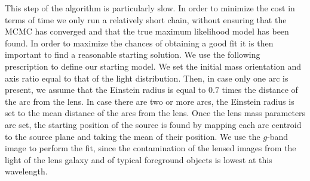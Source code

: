 \documentclass[a4paper,fleqn,usenatbib]{mnras}
\begin{document}
This step of the algorithm is particularly slow. In order to minimize the cost in terms of time we only run a relatively short chain, without ensuring that the MCMC has converged and that the true maximum likelihood model has been found.
In order to maximize the chances of obtaining a good fit it is then important to find a reasonable starting solution.
We use the following prescription to define our starting model. We set the initial mass orientation and axis ratio equal to that of the light distribution. Then, in case only one arc is present, we assume that the Einstein radius is equal to $0.7$ times the distance of the arc from the lens. In case there are two or more arcs, the Einstein radius is set to the mean distance of the arcs from the lens.
Once the lens mass parameters are set, the starting position of the source is found by mapping each arc centroid to the source plane and taking the mean of their position.
We use the $g$-band image to perform the fit, since the contamination of the lensed images from the light of the lens galaxy and of typical foreground objects is lowest at this wavelength.
\end{document}
